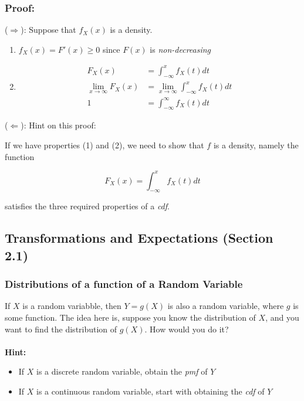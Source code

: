 \documentclass{article}
\begin{document}
\subsubsection*{Proof:}

($\Rightarrow$): Suppose that $f_X(x)$ is a density. 
\begin{enumerate}
    \item $f_X(x) = F'(x) \geq 0$ since $F(x)$ is \textit{non-decreasing}
    \item \begin{equation*}
    \begin{split}
        F_X(x) &= \int_{-\infty}^x f_X(t) dt\\
        \lim_{x\to\infty} F_X(x) &= \lim_{x\to\infty} \int_{-\infty}^x f_X(t) dt\\
        1 &= \int_{-\infty}^\infty f_X(t) dt
    \end{split}
    \end{equation*}
\end{enumerate}

\noindent ($\Leftarrow$): Hint on this proof:

If we have properties (1) and (2), we need to show that $f$ is a density, namely the function

\begin{equation*}
    F_X(x) = \int_{-\infty}^x f_X(t) dt    
\end{equation*}

satisfies the three required properties of a \textit{cdf}.


\subsection{Transformations and Expectations (Section 2.1)}

\subsubsection{Distributions of a function of a Random Variable}

If $X$ is a random variabble, then $Y = g(X)$ is also a random variable, where $g$ is some function. The idea here is, suppose you know the distribution of $X$, and you want to find the distribution of $g(X)$. How would you do it?
\\~\\
\noindent \textbf{Hint:}
\begin{itemize}
    \item If $X$ is a discrete random variable, obtain the \textit{pmf} of $Y$
    \item If $X$ is a continuous random variable, start with obtaining the \textit{cdf} of $Y$
\end{itemize}
\end{document}
